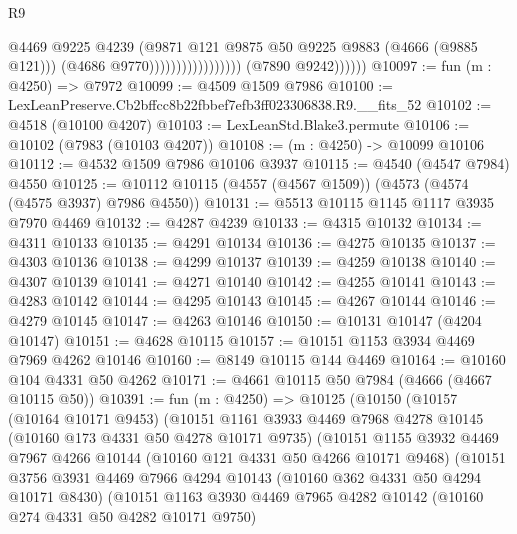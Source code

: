 \begin{lexlean}{R9}
\begin{coremodule}
                                              @4469
                                              @9225
                                              @4239
                                              (@9871
                                                @121
                                                @9875
                                                @50
                                                @9225
                                                @9883
                                                (@4666 (@9885 @121)))
                                              (@4686 @9770)))))))))))))))))
              (@7890 @9242))))))
@10097 := fun (m : @4250) => @7972
@10099 := @4509 @1509 @7986
@10100 := LexLeanPreserve.Cb2bffcc8b22fbbef7efb3ff023306838.R9.__fits_52
@10102 := @4518 (@10100 @4207)
@10103 := LexLeanStd.Blake3.permute
@10106 := @10102 (@7983 (@10103 @4207))
@10108 := (m : @4250) -> @10099 @10106
@10112 := @4532 @1509 @7986 @10106 @3937
@10115 := @4540 (@4547 @7984) @4550
@10125 := @10112 @10115 (@4557 (@4567 @1509)) (@4573 (@4574 (@4575 @3937) @7986 @4550))
@10131 := @5513 @10115 @1145 @1117 @3935 @7970 @4469
@10132 := @4287 @4239
@10133 := @4315 @10132
@10134 := @4311 @10133
@10135 := @4291 @10134
@10136 := @4275 @10135
@10137 := @4303 @10136
@10138 := @4299 @10137
@10139 := @4259 @10138
@10140 := @4307 @10139
@10141 := @4271 @10140
@10142 := @4255 @10141
@10143 := @4283 @10142
@10144 := @4295 @10143
@10145 := @4267 @10144
@10146 := @4279 @10145
@10147 := @4263 @10146
@10150 := @10131 @10147 (@4204 @10147)
@10151 := @4628 @10115
@10157 := @10151 @1153 @3934 @4469 @7969 @4262 @10146
@10160 := @8149 @10115 @144 @4469
@10164 := @10160 @104 @4331 @50 @4262
@10171 := @4661 @10115 @50 @7984 (@4666 (@4667 @10115 @50))
@10391 := fun (m : @4250) =>
  @10125
    (@10150
      (@10157
        (@10164 @10171 @9453)
        (@10151
          @1161
          @3933
          @4469
          @7968
          @4278
          @10145
          (@10160 @173 @4331 @50 @4278 @10171 @9735)
          (@10151
            @1155
            @3932
            @4469
            @7967
            @4266
            @10144
            (@10160 @121 @4331 @50 @4266 @10171 @9468)
            (@10151
              @3756
              @3931
              @4469
              @7966
              @4294
              @10143
              (@10160 @362 @4331 @50 @4294 @10171 @8430)
              (@10151
                @1163
                @3930
                @4469
                @7965
                @4282
                @10142
                (@10160 @274 @4331 @50 @4282 @10171 @9750)

\end{coremodule}
\end{lexlean}
